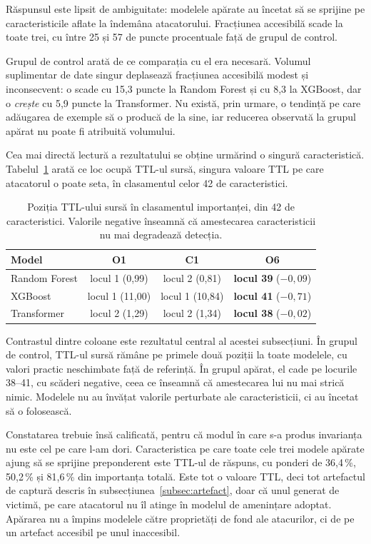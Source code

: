 Răspunsul este lipsit de ambiguitate: modelele apărate au încetat să se sprijine pe caracteristicile aflate la îndemâna atacatorului. Fracțiunea accesibilă scade la toate trei, cu între 25 și 57 de puncte procentuale față de grupul de control.

Grupul de control arată de ce comparația cu el era necesară. Volumul suplimentar de date singur deplasează fracțiunea accesibilă modest și inconsecvent: o scade cu 15,3 puncte la Random Forest și cu 8,3 la XGBoost, dar o \emph{crește} cu 5,9 puncte la Transformer. Nu există, prin urmare, o tendință pe care adăugarea de exemple să o producă de la sine, iar reducerea observată la grupul apărat nu poate fi atribuită volumului.

Cea mai directă lectură a rezultatului se obține urmărind o singură caracteristică. Tabelul~\ref{tab:o6-sttl} arată ce loc ocupă TTL-ul sursă, singura valoare TTL pe care atacatorul o poate seta, în clasamentul celor 42 de caracteristici.

\begin{table}[!ht]
    \caption{Poziția TTL-ului sursă în clasamentul importanței, din 42 de caracteristici. Valorile negative înseamnă că amestecarea caracteristicii nu mai degradează detecția.}
    \centering
    \begin{tabular}{|l|c|c|c|}
        \hline
        \textbf{Model} & \textbf{O1} & \textbf{C1} & \textbf{O6} \\
        \hline
        Random Forest & locul 1 \;(0,99) & locul 2 \;(0,81) & \textbf{locul 39} \;($-0{,}09$) \\
        \hline
        XGBoost & locul 1 \;(11,00) & locul 1 \;(10,84) & \textbf{locul 41} \;($-0{,}71$) \\
        \hline
        Transformer & locul 2 \;(1,29) & locul 2 \;(1,34) & \textbf{locul 38} \;($-0{,}02$) \\
        \hline
    \end{tabular}
    \label{tab:o6-sttl}
\end{table}

Contrastul dintre coloane este rezultatul central al acestei subsecțiuni. În grupul de control, TTL-ul sursă rămâne pe primele două poziții la toate modelele, cu valori practic neschimbate față de referință. În grupul apărat, el cade pe locurile 38--41, cu scăderi negative, ceea ce înseamnă că amestecarea lui nu mai strică nimic. Modelele nu au învățat valorile perturbate ale caracteristicii, ci au încetat să o folosească.

Constatarea trebuie însă calificată, pentru că modul în care s-a produs invarianța nu este cel pe care l-am dori. Caracteristica pe care toate cele trei modele apărate ajung să se sprijine preponderent este TTL-ul de răspuns, cu ponderi de 36,4\,\%, 50,2\,\% și 81,6\,\% din importanța totală. Este tot o valoare TTL, deci tot artefactul de captură descris în subsecțiunea~\ref{subsec:artefact}, doar că unul generat de victimă, pe care atacatorul nu îl atinge în modelul de amenințare adoptat. Apărarea nu a împins modelele către proprietăți de fond ale atacurilor, ci de pe un artefact accesibil pe unul inaccesibil.


